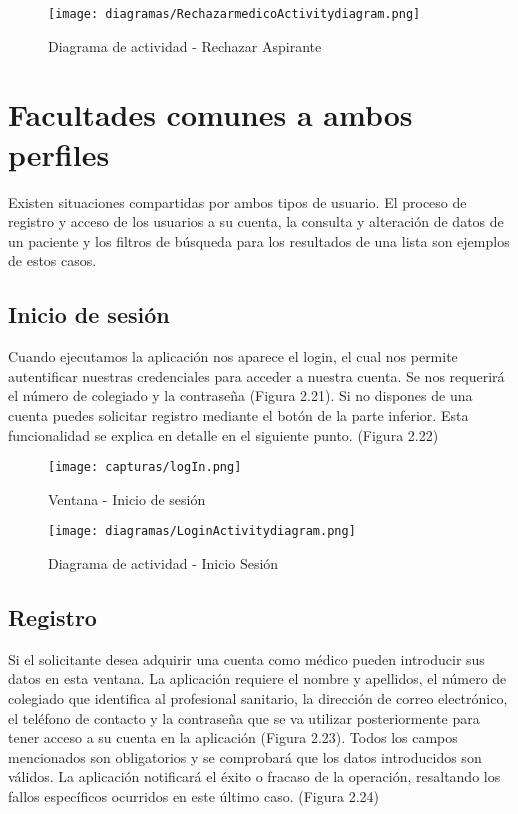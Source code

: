 \documentclass[11pt,spanish,
		listoftables,listoffigures]
		{tfgplantilla}
\begin{document}
\begin{figure}[H]
\centering
\texttt{[image: diagramas/RechazarmedicoActivitydiagram.png]}
\caption{Diagrama de actividad -  Rechazar Aspirante}
\end{figure}

\vfill
\section {Facultades comunes a ambos perfiles}

Existen situaciones compartidas por ambos tipos de usuario. El proceso de registro y acceso de los usuarios a su cuenta, la consulta y alteración de datos de un paciente y los filtros de búsqueda para los resultados de una lista son ejemplos de estos casos.

\subsection {Inicio de sesión}

Cuando ejecutamos la aplicación nos aparece el login, el cual nos permite autentificar nuestras credenciales para acceder a nuestra cuenta. Se nos requerirá el número de colegiado y la contraseña (Figura 2.21).
Si no dispones de una cuenta puedes solicitar registro mediante el botón de la parte inferior. Esta funcionalidad se explica en detalle en el siguiente punto. (Figura 2.22)

\begin{figure}[H]
\centering
\texttt{[image: capturas/logIn.png]}
\caption{Ventana - Inicio de sesión}
\end{figure}

\newpage
\begin{figure}[H]
\centering
\texttt{[image: diagramas/LoginActivitydiagram.png]}
\caption{Diagrama de actividad - Inicio Sesión}
\end{figure}

\newpage
\subsection {Registro}

Si el solicitante desea adquirir una cuenta como médico pueden introducir sus datos en esta ventana. La aplicación requiere el nombre y apellidos, el número de colegiado que identifica al profesional sanitario, la dirección de correo electrónico, el teléfono de contacto y la contraseña que se va utilizar posteriormente para tener acceso a su cuenta en la aplicación (Figura 2.23). Todos los campos mencionados son obligatorios y se comprobará que los datos introducidos son válidos.
La aplicación notificará el éxito o fracaso de la operación, resaltando los fallos específicos ocurridos en este último caso. (Figura 2.24)
\end{document}
